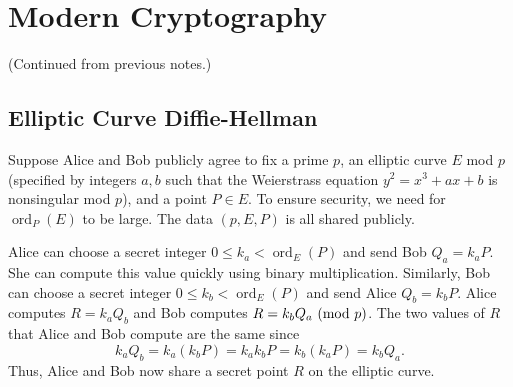 \documentclass[letterpaper]{article}
\DeclareMathOperator{\ord}{ord}
\begin{document}
\section{Modern Cryptography}
(Continued from previous notes.)

\subsection{Elliptic Curve Diffie-Hellman}
Suppose Alice and Bob publicly agree to fix a prime $p$, an elliptic curve $E$ mod $p$ (specified by integers $a, b$ such that the Weierstrass equation $y^2 = x^3 + ax + b$ is nonsingular mod $p$), and a point $P \in E$. To ensure security, we need for $\ord_{P}(E)$ to be large. The data $(p, E, P)$ is all shared publicly.

\bigskip 

Alice can choose a secret integer $0 \leq k_a < \ord_{E}(P)$ and send Bob $Q_a = k_a P$. She can compute this value quickly using binary multiplication. Similarly, Bob can choose a secret integer $0 \leq k_b < \ord_{E}(P)$ and send Alice $Q_b = k_b P$. Alice computes $R = k_a Q_b$ and Bob computes $R = k_b Q_a \ (\mathrm{mod}\ p)$. The two values of $R$ that Alice and Bob compute are the same since \[k_a Q_b = k_a (k_b P) = k_a k_b P = k_b (k_a P) = k_b Q_a.\]
Thus, Alice and Bob now share a secret point $R$ on the elliptic curve. 
\end{document}
